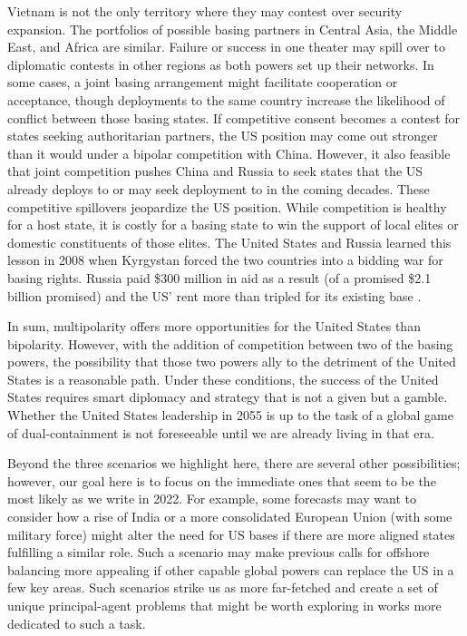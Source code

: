 Vietnam is not the only territory where they may contest over security expansion. The portfolios of possible basing partners in Central Asia, the Middle East, and Africa are similar. Failure or success in one theater may spill over to diplomatic contests in other regions as both powers set up their networks. In some cases, a joint basing arrangement might facilitate cooperation or acceptance, though deployments to the same country increase the likelihood of conflict between those basing states. If competitive consent becomes a contest for states seeking authoritarian partners, the US position may come out stronger than it would under a bipolar competition with China. However, it also feasible that joint competition pushes China and Russia to seek states that the US already deploys to or may seek deployment to in the coming decades. These competitive spillovers jeopardize the US position. While competition is healthy for a host state, it is costly for a basing state to win the support of local elites or domestic constituents of those elites. The United States and Russia learned this lesson in 2008 when Kyrgystan forced the two countries into a bidding war for basing rights. Russia paid \$300 million in aid as a result (of a promised \$2.1 billion promised) and the US' rent more than tripled for its existing base \cite{Cooley2020}.

In sum, multipolarity offers more opportunities for the United States than bipolarity. However, with the addition of competition between two of the basing powers, the possibility that those two powers ally to the detriment of the United States is a reasonable path. Under these conditions, the success of the United States requires smart diplomacy and strategy that is not a given but a gamble. Whether the United States leadership in 2055 is up to the task of a global game of dual-containment is not foreseeable until we are already living in that era. 

Beyond the three scenarios we highlight here, there are several other possibilities; however, our goal here is to focus on the immediate ones that seem to be the most likely as we write in 2022. For example, some forecasts may want to consider how a rise of India or a more consolidated European Union (with some military force) might alter the need for US bases if there are more aligned states fulfilling a similar role. Such a scenario may make previous calls for offshore balancing more appealing if other capable global powers can replace the US in a few key areas. Such scenarios strike us as more far-fetched and create a set of unique principal-agent problems that might be worth exploring in works more dedicated to such a task.

